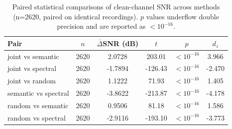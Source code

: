 \begin{table}[t]
\centering
\caption{Paired statistical comparisons of clean-channel SNR across methods (n=2620, paired on identical recordings). $p$ values underflow double precision and are reported as $<10^{-16}$.}
\label{tab:stats}
\scriptsize
\begin{tabular}{lccccc}
\toprule
\textbf{Pair} & \textbf{$n$} & \textbf{$\bar{\Delta}$SNR (dB)} & \textbf{$t$} & \textbf{$p$} & \textbf{$d_z$} \\
\midrule
joint vs semantic & 2620 & 2.0728 & 203.01 & $<10^{-16}$ & 3.966 \\
joint vs spectral & 2620 & -1.7894 & -126.43 & $<10^{-16}$ & -2.470 \\
joint vs random & 2620 & 1.1222 & 71.93 & $<10^{-16}$ & 1.405 \\
semantic vs spectral & 2620 & -3.8622 & -213.87 & $<10^{-16}$ & -4.178 \\
random vs semantic & 2620 & 0.9506 & 81.18 & $<10^{-16}$ & 1.586 \\
random vs spectral & 2620 & -2.9116 & -193.10 & $<10^{-16}$ & -3.773 \\
\bottomrule
\end{tabular}
\end{table}
